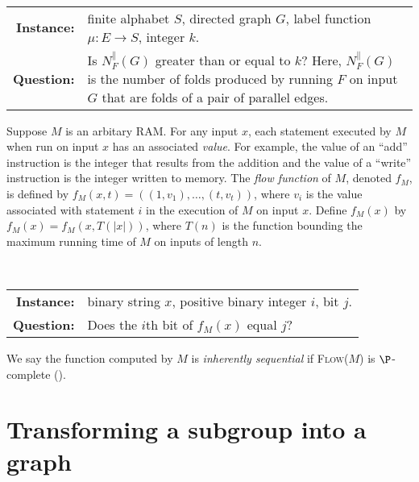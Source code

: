 \documentclass{article}
\newcommand{\PFolds}{\textsc{Parallel Folds}}
\begin{document}
\begin{definition}[\PFolds]
  \mbox{} \\
  \begin{tabular}{r p{9.5cm}}
    \textbf{Instance:} & finite alphabet $S$, directed graph $G$, label function $\mu \colon E \to S$, integer $k$. \\
    \textbf{Question:} & Is $N^\|_F(G)$ greater than or equal to $k$? Here, $N^\|_F(G)$ is the number of folds produced by running $F$ on input $G$ that are folds of a pair of parallel edges.
  \end{tabular}
\end{definition}

Suppose $M$ is an arbitary RAM.
For any input $x$, each statement executed by $M$ when run on input $x$ has an associated \emph{value}.
For example, the value of an ``add'' instruction is the integer that results from the addition and the value of a ``write'' instruction is the integer written to memory.
The \emph{flow function} of $M$, denoted $f_M$, is defined by $f_M(x, t) = ((1, v_1), \dotsc, (t, v_t))$, where $v_i$ is the value associated with statement $i$ in the execution of $M$ on input $x$.
Define $f_M(x)$ by $f_M(x) = f_M(x, T(|x|))$, where $T(n)$ is the function bounding the maximum running time of $M$ on inputs of length $n$.

\begin{definition}
  \mbox{} \\
  \begin{tabular}{r p{9.5cm}}
    \textbf{Instance:} & binary string $x$, positive binary integer $i$, bit $j$. \\
    \textbf{Question:} & Does the $i$th bit of $f_M(x)$ equal $j$?
  \end{tabular}
\end{definition}

We say the function computed by $M$ is \emph{inherently sequential} if \textsc{Flow($M$)} is $\P$-complete (\autocite[Definition~8.2.2]{ghr95}).

\section{Transforming a subgroup into a graph}
\end{document}
